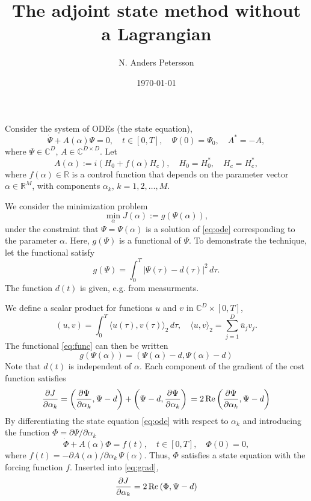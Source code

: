 \documentclass{article}
\begin{document}
\title{The adjoint state method without a Lagrangian}
\author{N. Anders Petersson}
\date{\today}
\maketitle

Consider the system of ODEs (the state equation),
\begin{equation}\label{eq:ode}
  \dot{\Psi} + A(\alpha)\Psi =0,\quad
  t\in[0,T], \quad \Psi(0) = \Psi_0,\quad A^* = -A,
\end{equation}
where $\Psi\in {\mathbb C}^D$, $A\in {\mathbb C}^{D\times D}$. Let
\[
A(\alpha) := i\left(H_0 + f(\alpha)H_c\right),\quad H_0=H_0^*, \quad H_c = H_c^*,
\]
where $f(\alpha)\in \mathbb{R}$ is a control function that depends
on the parameter vector $\alpha\in{\mathbb R}^M$, with components $\alpha_k$,
$k=1,2,\ldots,M$.

We consider the minimization problem
\[
\min_\alpha J(\alpha) := g(\Psi(\alpha)),
\]
under the constraint that $\Psi=\Psi(\alpha)$ is a solution of \eqref{eq:ode}
corresponding to the parameter $\alpha$.  Here, $g(\Psi)$ is a
functional of $\Psi$. To demonstrate the technique, let the functional
satisfy
\begin{equation}\label{eq:func}
  g(\Psi) = \int_0^T |\Psi(\tau) - d(\tau)|^2\, d\tau.
\end{equation}
The function $d(t)$ is given, e.g. from measurments.

We define a scalar product for functions $u$ and $v$ in ${\mathbb C}^D \times [0,T]$,
\[
(u,v) = \int_0^T \langle u(\tau), v(\tau)\rangle_2\, d\tau,\quad \langle u, v\rangle_2 =
\sum_{j=1}^D \bar{u}_j v_j.
\]
The functional \eqref{eq:func} can then be written
\[
g(\Psi(\alpha)) = (\Psi(\alpha) - d, \Psi(\alpha) - d)
\]
Note that $d(t)$ is independent of $\alpha$. Each component of the gradient of the cost function satisfies
\begin{equation}\label{eq:grad}
  \frac{\partial J}{\partial \alpha_k} =
%
  \left(\frac{\partial\Psi}{\partial \alpha_k}, \Psi-d \right) +
  \left(\Psi-d, \frac{\partial\Psi}{\partial \alpha_k} \right) \\
  = 2\, {\rm Re} \left(
\frac{\partial\Psi}{\partial \alpha_k}, \Psi-d \right)
\end{equation}
By differentiating the state equation \eqref{eq:ode} with respect to
$\alpha_k$ and introducing the function $\Phi = \partial \Psi/\partial \alpha_k$
\begin{equation}\label{eq:state}
\dot{\Phi} +
A(\alpha) \Phi = f(t),\quad
t\in[0,T], \quad \Phi(0) = 0,
\end{equation}
where $f(t) = - \partial A(\alpha)/\partial \alpha_k\,\Psi(\alpha)$.
Thus, $\Phi$ satisfies a state equation with the forcing function
$f$. Inserted into \eqref{eq:grad},
\begin{equation}\label{eq:grad-formula}
\frac{\partial J}{\partial \alpha_k} = 2\, {\rm Re} \left( \Phi, \Psi-d \right)
\end{equation}
 
\end{document}
